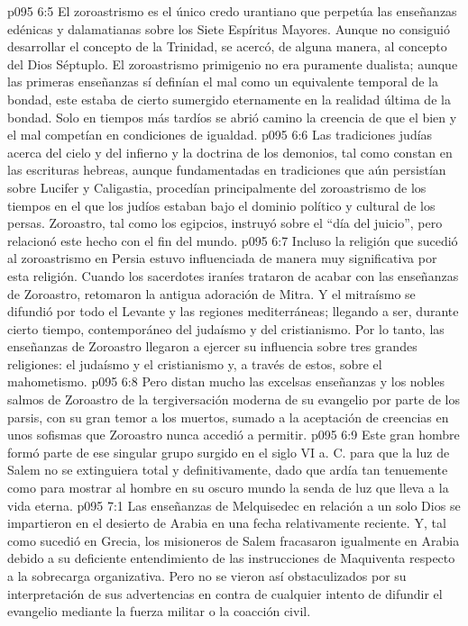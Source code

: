 \vs p095 6:5 \pc El zoroastrismo es el único credo urantiano que perpetúa las enseñanzas edénicas y dalamatianas sobre los Siete Espíritus Mayores. Aunque no consiguió desarrollar el concepto de la Trinidad, se acercó, de alguna manera, al concepto del Dios Séptuplo. El zoroastrismo primigenio no era puramente dualista; aunque las primeras enseñanzas sí definían el mal como un equivalente temporal de la bondad, este estaba de cierto sumergido eternamente en la realidad última de la bondad. Solo en tiempos más tardíos se abrió camino la creencia de que el bien y el mal competían en condiciones de igualdad.
\vs p095 6:6 Las tradiciones judías acerca del cielo y del infierno y la doctrina de los demonios, tal como constan en las escrituras hebreas, aunque fundamentadas en tradiciones que aún persistían sobre Lucifer y Caligastia, procedían principalmente del zoroastrismo de los tiempos en el que los judíos estaban bajo el dominio político y cultural de los persas. Zoroastro, tal como los egipcios, instruyó sobre el “día del juicio”, pero relacionó este hecho con el fin del mundo.
\vs p095 6:7 Incluso la religión que sucedió al zoroastrismo en Persia estuvo influenciada de manera muy significativa por esta religión. Cuando los sacerdotes iraníes trataron de acabar con las enseñanzas de Zoroastro, retomaron la antigua adoración de Mitra. Y el mitraísmo se difundió por todo el Levante y las regiones mediterráneas; llegando a ser, durante cierto tiempo, contemporáneo del judaísmo y del cristianismo. Por lo tanto, las enseñanzas de Zoroastro llegaron a ejercer su influencia sobre tres grandes religiones: el judaísmo y el cristianismo y, a través de estos, sobre el mahometismo.
\vs p095 6:8 \pc Pero distan mucho las excelsas enseñanzas y los nobles salmos de Zoroastro de la tergiversación moderna de su evangelio por parte de los parsis, con su gran temor a los muertos, sumado a la aceptación de creencias en unos sofismas que Zoroastro nunca accedió a permitir.
\vs p095 6:9 Este gran hombre formó parte de ese singular grupo surgido en el siglo VI a. C. para que la luz de Salem no se extinguiera total y definitivamente, dado que ardía tan tenuemente como para mostrar al hombre en su oscuro mundo la senda de luz que lleva a la vida eterna.
\vs p095 7:1 Las enseñanzas de Melquisedec en relación a un solo Dios se impartieron en el desierto de Arabia en una fecha relativamente reciente. Y, tal como sucedió en Grecia, los misioneros de Salem fracasaron igualmente en Arabia debido a su deficiente entendimiento de las instrucciones de Maquiventa respecto a la sobrecarga organizativa. Pero no se vieron así obstaculizados por su interpretación de sus advertencias en contra de cualquier intento de difundir el evangelio mediante la fuerza militar o la coacción civil.
